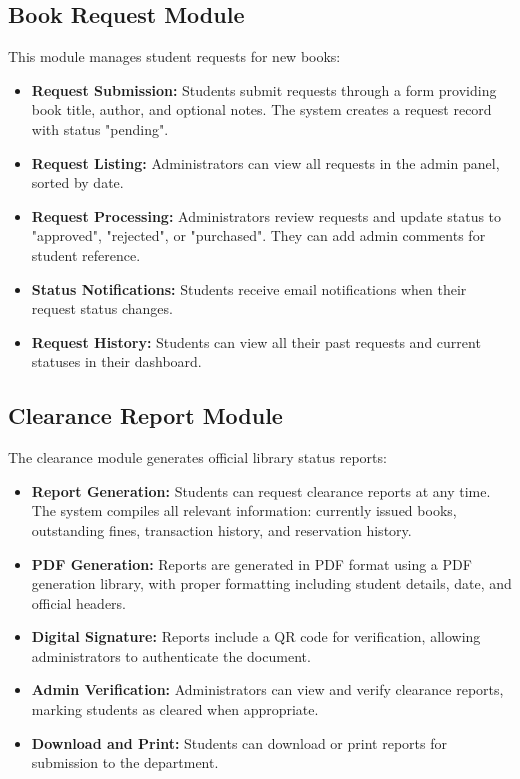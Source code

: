 \documentclass[12pt,a4paper]{report}
\begin{document}
\subsection{Book Request Module}

This module manages student requests for new books:

\begin{itemize}
    \item \textbf{Request Submission:} Students submit requests through a form providing book title, author, and optional notes. The system creates a request record with status "pending".
    
    \item \textbf{Request Listing:} Administrators can view all requests in the admin panel, sorted by date.
    
    \item \textbf{Request Processing:} Administrators review requests and update status to "approved", "rejected", or "purchased". They can add admin comments for student reference.
    
\newpage    
    
    \item \textbf{Status Notifications:} Students receive email notifications when their request status changes.
    
    \item \textbf{Request History:} Students can view all their past requests and current statuses in their dashboard.
\end{itemize}

\subsection{Clearance Report Module}

The clearance module generates official library status reports:

\begin{itemize}
    \item \textbf{Report Generation:} Students can request clearance reports at any time. The system compiles all relevant information: currently issued books, outstanding fines, transaction history, and reservation history.
    
    \item \textbf{PDF Generation:} Reports are generated in PDF format using a PDF generation library, with proper formatting including student details, date, and official headers.
    
    \item \textbf{Digital Signature:} Reports include a QR code for verification, allowing administrators to authenticate the document.
    
    \item \textbf{Admin Verification:} Administrators can view and verify clearance reports, marking students as cleared when appropriate.
    
    \item \textbf{Download and Print:} Students can download or print reports for submission to the department.
\end{itemize}
\end{document}
